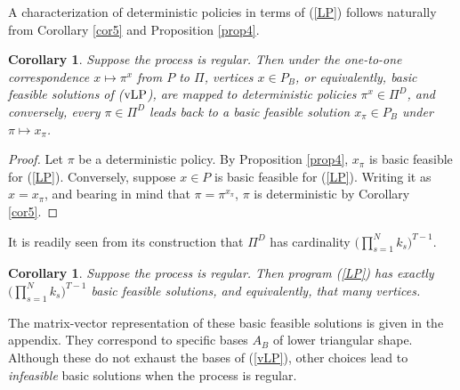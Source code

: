 \documentclass{article}
\newtheorem{corollary}[theorem]{Corollary}
\theoremstyle{definition}
\numberwithin{equation}{section}
\begin{document}
A characterization of deterministic policies in terms of (\ref{LP}) follows naturally from Corollary \ref{cor5} and Proposition \ref{prop4}.

\begin{corollary}
\label{cor7}
% 
Suppose the process is regular. Then under
the one-to-one correspondence $x \mapsto \pi^x$ from $P$ to $\Pi$, 
vertices $x \in P_B$, or equivalently, basic feasible solutions of {\rm (${\rm vLP}$)}, are mapped to deterministic
policies $\pi^x\in  \Pi^{D}$, and conversely, every $\pi \in \Pi^{D}$ leads back to a 
basic feasible solution $x_\pi\in P_B$ under $\pi \mapsto x_\pi$. 
\end{corollary}

\begin{proof}
%
Let $\pi$ be a deterministic policy. By Proposition \ref{prop4}, 
$x_\pi$ is basic feasible for (\ref{LP}). 
Conversely, suppose $x\in P$ is basic feasible for (\ref{LP}). Writing it as $x=x_\pi$, and bearing in mind that 
$\pi = \pi^{x_\pi}$, $\pi$ is deterministic by Corollary \ref{cor5}. 
\end{proof}

It is readily seen from its construction that $\Pi^{D}$ has cardinality  $\bigl(\prod_{s = 1}^{N}k_s\bigr)^{T-1}$. 


\begin{corollary}
\label{cor8}
Suppose the process is regular. Then
program {\rm (\ref{LP})} has exactly $\bigl(\prod_{s = 1}^{N}k_s\bigr)^{T-1}$ basic feasible solutions,
and equivalently, that many vertices.
\end{corollary}

The matrix-vector representation of these basic feasible solutions is given in the appendix. They correspond to specific bases $A_B$ of lower triangular shape. Although these do not exhaust the bases of (\ref{vLP}), other choices lead to {\it infeasible} basic solutions when the process is regular. %
\\
\end{document}
